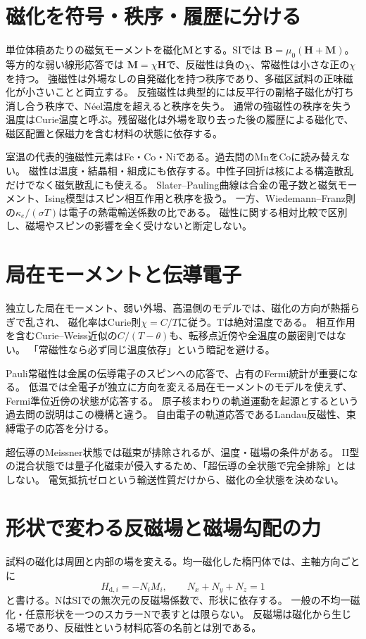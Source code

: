 \section{磁化を符号・秩序・履歴に分ける}\label{theory:em:magnetism}
単位体積あたりの磁気モーメントを磁化\(\mathbf M\)とする。SIでは
\(\mathbf B=\mu_0(\mathbf H+\mathbf M)\)。等方的な弱い線形応答では
\(\mathbf M=\chi\mathbf H\)で、反磁性は負の\(\chi\)、常磁性は小さな正の\(\chi\)を持つ。
強磁性は外場なしの自発磁化を持つ秩序であり、多磁区試料の正味磁化が小さいことと両立する。
反強磁性は典型的には反平行の副格子磁化が打ち消し合う秩序で、Néel温度を超えると秩序を失う。
通常の強磁性の秩序を失う温度はCurie温度と呼ぶ。残留磁化は外場を取り去った後の履歴による磁化で、
磁区配置と保磁力を含む材料の状態に依存する。\cite{openstax_magnetism}

室温の代表的強磁性元素はFe・Co・Niである。過去問のMnをCoに読み替えない。
磁性は温度・結晶相・組成にも依存する。中性子回折は核による構造散乱だけでなく磁気散乱にも使える。
Slater--Pauling曲線は合金の電子数と磁気モーメント、Ising模型はスピン相互作用と秩序を扱う。
一方、Wiedemann--Franz則の\(\kappa_e/(\sigma T)\)は電子の熱電輸送係数の比である。
磁性に関する相対比較で区別し、磁場やスピンの影響を全く受けないと断定しない。\cite{em51_mit_magnetic_readings,em51_wf}

\section{局在モーメントと伝導電子}\label{theory:em:pauli}
独立した局在モーメント、弱い外場、高温側のモデルでは、磁化の方向が熱揺らぎで乱され、
磁化率はCurie則\(\chi=C/T\)に従う。Tは絶対温度である。
相互作用を含むCurie--Weiss近似の\(C/(T-\theta)\)も、転移点近傍や全温度の厳密則ではない。
「常磁性なら必ず同じ温度依存」という暗記を避ける。

Pauli常磁性は金属の伝導電子のスピンへの応答で、占有のFermi統計が重要になる。
低温では全電子が独立に方向を変える局在モーメントのモデルを使えず、Fermi準位近傍の状態が応答する。
原子核まわりの軌道運動を起源とするという過去問の説明はこの機構と違う。
自由電子の軌道応答であるLandau反磁性、束縛電子の応答を分ける。\cite{em51_pauli}

超伝導のMeissner状態では磁束が排除されるが、温度・磁場の条件がある。
II型の混合状態では量子化磁束が侵入するため、「超伝導の全状態で完全排除」とはしない。
電気抵抗ゼロという輸送性質だけから、磁化の全状態を決めない。

\section{形状で変わる反磁場と磁場勾配の力}\label{theory:em:demag}
試料の磁化は周囲と内部の場を変える。均一磁化した楕円体では、主軸方向ごとに
\[
 H_{\mathrm d,i}=-N_iM_i,\qquad N_x+N_y+N_z=1
\]
と書ける。NはSIでの無次元の反磁場係数で、形状に依存する。
一般の不均一磁化・任意形状を一つのスカラーNで表すとは限らない。\cite{em51_demag}
反磁場は磁化から生じる場であり、反磁性という材料応答の名前とは別である。

